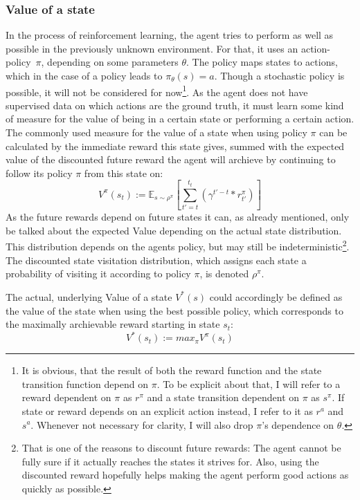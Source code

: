 \subsubsection{Value of a state}
In the process of reinforcement learning, the agent tries to perform as well as possible in the previously unknown environment. For that, it uses an \mbox{action-policy $\pi$,} depending on some parameters $\theta$. The policy maps states to actions, which in the case of a  policy leads to $\pi_\theta(s) = a$. Though a stochastic policy is possible, it will not be considered for now\footnote{It is obvious, that the result of both the reward function and the state transition function depend on $\pi$. To be explicit about that, I will refer to a reward dependent on $\pi$ as $r^\pi$ and a state transition dependent on $\pi$ as $s^\pi$. If state or reward depends on an explicit action instead, I refer to it as $r^a$ and $s^a$. Whenever not necessary for clarity, I will also drop $\pi$'s dependence on $\theta$.}. %
As the agent does not have supervised data on which actions are the ground truth, it must learn some kind of measure for the value of being in a certain state or performing a certain action. The commonly used measure for the value of a state when using policy $\pi$ can be calculated by the immediate reward this state gives, summed with the expected value of the discounted future reward the agent will archieve by continuing to follow its policy $\pi$ from this state on:
\begin{equation} \label{eq:valuedefinition}
	V^\pi(s_t) := \mathds{E}_{s\sim\rho^\pi} \left[ \sum_{t'=t}^{t_t} ( \gamma^{t'-t} * r^\pi_{t'} ) \right]
\end{equation}
As the future rewards depend on future states it can, as already mentioned, only be talked about the expected Value depending on the actual state distribution. This distribution depends on the agents policy, but may still be indeterministic\footnote{That is one of the reasons to discount future rewards: The agent cannot be fully sure if it actually reaches the states it strives for. Also, using the discounted reward hopefully helps making the agent perform good actions as quickly as possible.}. The discounted state visitation distribution, which assigns each state a probability of visiting it according to policy $\pi$, is denoted $\rho^\pi$. 

The actual, underlying Value of a state $V^*(s)$ could accordingly be defined as the value of the state when using the best possible policy, which corresponds to the maximally archievable reward starting in state $s_t$:
\begin{equation*} 
	V^*(s_t) := max_\pi V^\pi(s_t)
\end{equation*}

